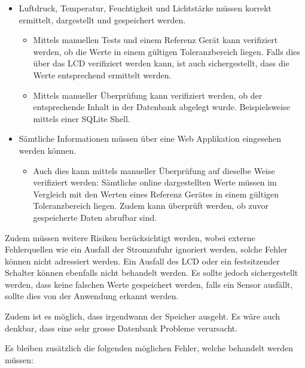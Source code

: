 \documentclass[
    10pt,
    a4paper,
]{scrartcl}
\begin{document}
\begin{itemize}
    \item Luftdruck, Temperatur, Feuchtigkeit und Lichtstärke müssen korrekt ermittelt,
        dargestellt und gespeichert werden.
        \begin{itemize}
            \item Mittels manuellen Tests und einem Referenz Gerät kann verifiziert
                werden, ob die Werte in einem gültigen Toleranzbereich liegen. Falls dies
                über das LCD verifiziert werden kann, ist auch sichergestellt, dass die
                Werte entsprechend ermittelt werden.
            \item Mittels manueller Überprüfung kann verifiziert werden, ob der
                entsprechende Inhalt in der Datenbank abgelegt wurde. Beispielsweise
                mittels einer SQLite Shell.
        \end{itemize}
    \item Sämtliche Informationen müssen über eine Web Applikation eingesehen werden
        können.
        \begin{itemize}
            \item Auch dies kann mittels manueller Überprüfung auf dieselbe Weise
                verifiziert werden: Sämtliche online dargestellten Werte müssen im
                Vergleich mit den Werten eines Referenz Gerätes in einem gültigen
                Toleranzbereich liegen. Zudem kann überprüft werden, ob zuvor gespeicherte
                Daten abrufbar sind.
        \end{itemize}
\end{itemize}

Zudem müssen weitere Risiken berücksichtigt werden, wobei externe Fehlerquellen wie ein
Ausfall der Stromzufuhr ignoriert werden, solche Fehler können nicht adressiert werden.
Ein Ausfall des LCD oder ein festsitzender Schalter können ebenfalls nicht behandelt
werden. Es sollte jedoch sichergestellt werden, dass keine falschen Werte gespeichert
werden, falls ein Sensor ausfällt, sollte dies von der Anwendung erkannt werden.

Zudem ist es möglich, dass irgendwann der Speicher ausgeht. Es wäre auch denkbar, dass
eine sehr grosse Datenbank Probleme verursacht.

Es bleiben zusätzlich die folgenden möglichen Fehler, welche behandelt werden müssen:
\end{document}
